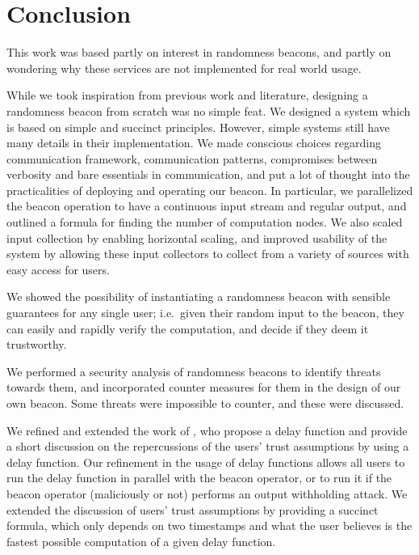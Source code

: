 \section{Conclusion}%
\label{sec:conclusion}

This work was based partly on interest in randomness beacons, and partly on wondering why these services are not implemented for real world usage.

While we took inspiration from previous work and literature, designing a randomness beacon from scratch was no simple feat.
We designed a system which is based on simple and succinct principles.
However, simple systems still have many details in their implementation.
We made conscious choices regarding communication framework, communication patterns, compromises between verbosity and bare essentials in communication, and put a lot of thought into the practicalities of deploying and operating our beacon.
In particular, we parallelized the beacon operation to have a continuous input stream and regular output, and outlined a formula for finding the number of computation nodes.
We also scaled input collection by enabling horizontal scaling, and improved usability of the system by allowing these input collectors to collect from a variety of sources with easy access for users.

We showed the possibility of instantiating a randomness beacon with sensible guarantees for any single user; i.e.\ given their random input to the beacon, they can easily and rapidly verify the computation, and decide if they deem it trustworthy.

We performed a security analysis of randomness beacons to identify threats towards them, and incorporated counter measures for them in the design of our own beacon.
Some threats were impossible to counter, and these were discussed.

We refined and extended the work of \citet{randomzoo}, who propose a delay function and provide a short discussion on the repercussions of the users' trust assumptions by using a delay function.
Our refinement in the usage of delay functions allows all users to run the delay function in parallel with the beacon operator, or to run it if the beacon operator (maliciously or not) performs an output withholding attack.
We extended the discussion of users' trust assumptions by providing a succinct formula, which only depends on two timestamps and what the user believes is the fastest possible computation of a given delay function.

